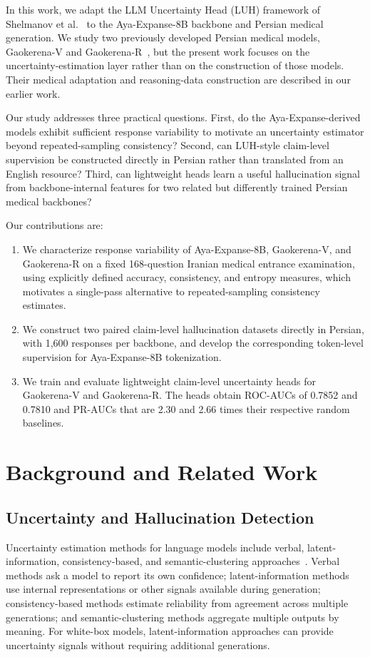\documentclass[conference]{IEEEtran}
\begin{document}
In this work, we adapt the LLM Uncertainty Head (LUH) framework of Shelmanov et al.~\cite{b14} to the Aya-Expanse-8B backbone and Persian medical generation. We study two previously developed Persian medical models, Gaokerena-V and Gaokerena-R~\cite{b11,b12}, but the present work focuses on the uncertainty-estimation layer rather than on the construction of those models. Their medical adaptation and reasoning-data construction are described in our earlier work.

Our study addresses three practical questions. First, do the Aya-Expanse-derived models exhibit sufficient response variability to motivate an uncertainty estimator beyond repeated-sampling consistency? Second, can LUH-style claim-level supervision be constructed directly in Persian rather than translated from an English resource? Third, can lightweight heads learn a useful hallucination signal from backbone-internal features for two related but differently trained Persian medical backbones?

Our contributions are:
\begin{enumerate}[leftmargin=*]
\item We characterize response variability of Aya-Expanse-8B, Gaokerena-V, and Gaokerena-R on a fixed 168-question Iranian medical entrance examination, using explicitly defined accuracy, consistency, and entropy measures, which motivates a single-pass alternative to repeated-sampling consistency estimates.
\item We construct two paired claim-level hallucination datasets directly in Persian, with 1,600 responses per backbone, and develop the corresponding token-level supervision for Aya-Expanse-8B tokenization.
\item We train and evaluate lightweight claim-level uncertainty heads for Gaokerena-V and Gaokerena-R. The heads obtain ROC-AUCs of 0.7852 and 0.7810 and PR-AUCs that are 2.30 and 2.66 times their respective random baselines.
\end{enumerate}

\section{Background and Related Work}

\subsection{Uncertainty and Hallucination Detection}

Uncertainty estimation methods for language models include verbal, latent-information, consistency-based, and semantic-clustering approaches~\cite{b7}. Verbal methods ask a model to report its own confidence; latent-information methods use internal representations or other signals available during generation; consistency-based methods estimate reliability from agreement across multiple generations; and semantic-clustering methods aggregate multiple outputs by meaning. For white-box models, latent-information approaches can provide uncertainty signals without requiring additional generations.
\end{document}
